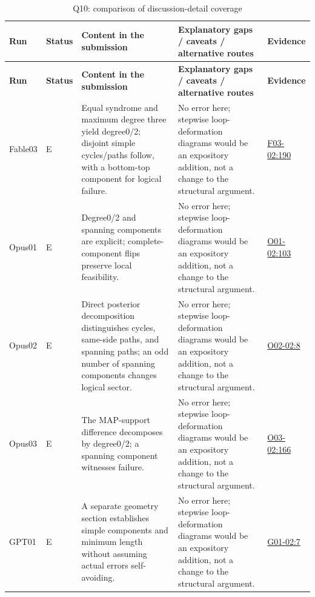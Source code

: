 \documentclass[11pt,a4paper]{article}
\begin{document}
{\fontsize{9.0}{12.6}\selectfont
\setlength{\tabcolsep}{2.5pt}
\begin{longtable}{>{\raggedright\arraybackslash}p{}>{\raggedright\arraybackslash}p{}>{\raggedright\arraybackslash}p{}>{\raggedright\arraybackslash}p{}>{\raggedright\arraybackslash}p{}}
\caption{Q10: comparison of discussion-detail coverage}\\
\toprule
\textbf{Run} & \textbf{Status} & \textbf{Content in the submission} & \textbf{Explanatory gaps /\allowbreak{} caveats /\allowbreak{} alternative routes} & \textbf{Evidence}\tabularnewline
\midrule
\endfirsthead
\toprule
\textbf{Run} & \textbf{Status} & \textbf{Content in the submission} & \textbf{Explanatory gaps /\allowbreak{} caveats /\allowbreak{} alternative routes} & \textbf{Evidence}\tabularnewline
\midrule
\endhead
{}Fable03 & E & Equal syndrome and maximum degree three yield degree0/\allowbreak{}2; disjoint simple cycles/\allowbreak{}paths follow,\allowbreak{} with a bottom-top component for logical failure. & No error here; stepwise loop-deformation diagrams would be an expository addition,\allowbreak{} not a change to the structural argument. & \hyperref[src:F03-02]{F03-02:190}\tabularnewline
{}Opus01 & E & Degree0/\allowbreak{}2 and spanning components are explicit; complete-component flips preserve local feasibility. & No error here; stepwise loop-deformation diagrams would be an expository addition,\allowbreak{} not a change to the structural argument. & \hyperref[src:O01-02]{O01-02:103}\tabularnewline
{}Opus02 & E & Direct posterior decomposition distinguishes cycles,\allowbreak{} same-side paths,\allowbreak{} and spanning paths; an odd number of spanning components changes logical sector. & No error here; stepwise loop-deformation diagrams would be an expository addition,\allowbreak{} not a change to the structural argument. & \hyperref[src:O02-02]{O02-02:8}\tabularnewline
{}Opus03 & E & The MAP-support difference decomposes by degree0/\allowbreak{}2; a spanning component witnesses failure. & No error here; stepwise loop-deformation diagrams would be an expository addition,\allowbreak{} not a change to the structural argument. & \hyperref[src:O03-02]{O03-02:166}\tabularnewline
{}GPT01 & E & A separate geometry section establishes simple components and minimum length without assuming actual errors self-avoiding. & No error here; stepwise loop-deformation diagrams would be an expository addition,\allowbreak{} not a change to the structural argument. & \hyperref[src:G01-02]{G01-02:7}\tabularnewline

\end{longtable}}
\end{document}
